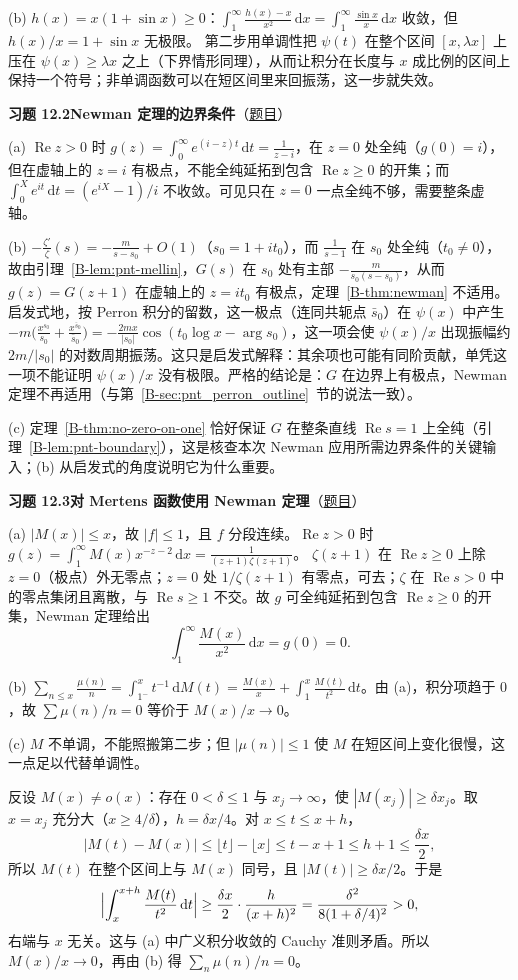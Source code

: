 \documentclass[11pt,a4paper]{article}
\newcommand{\dd}{\,\mathrm{d}}
\renewcommand{\Re}{\operatorname{Re}}
\newcommand{\bref}[1]{\ref*{B-#1}}
\newcommand{\Sol}[2]{%
  \par\addvspace{1.2em}\noindent
  \hypertarget{s:#1}{}\textbf{习题 #1\quad #2}\hfill{\small（\hyperlink{q:#1}{题目}）}\par
  \nopagebreak\smallskip}
\begin{document}
(b) $h(x)=x(1+\sin x)\ge0$：$\int_1^\infty\frac{h(x)-x}{x^2}\dd x=\int_1^\infty\frac{\sin x}x\dd x$ 收敛，但 $h(x)/x=1+\sin x$ 无极限。
第二步用单调性把 $\psi(t)$ 在整个区间 $[x,\lambda x]$ 上压在 $\psi(x)\ge\lambda x$ 之上（下界情形同理），从而让积分在长度与 $x$ 成比例的区间上保持一个符号；非单调函数可以在短区间里来回振荡，这一步就失效。

\Sol{12.2}{Newman 定理的边界条件}
(a) $\Re z>0$ 时 $g(z)=\int_0^\infty e^{(i-z)t}\dd t=\frac1{z-i}$，在 $z=0$ 处全纯（$g(0)=i$），但在虚轴上的 $z=i$ 有极点，不能全纯延拓到包含 $\Re z\ge0$ 的开集；而 $\int_0^X e^{it}\dd t=(e^{iX}-1)/i$ 不收敛。可见只在 $z=0$ 一点全纯不够，需要整条虚轴。

(b) $-\frac{\zeta'}{\zeta}(s)=-\frac m{s-s_0}+O(1)$（$s_0=1+it_0$），而 $\frac1{s-1}$ 在 $s_0$ 处全纯（$t_0\ne0$），故由引理~\bref{lem:pnt-mellin}，$G(s)$ 在 $s_0$ 处有主部 $-\frac m{s_0(s-s_0)}$，从而 $g(z)=G(z+1)$ 在虚轴上的 $z=it_0$ 有极点，定理~\bref{thm:newman} 不适用。
启发式地，按 Perron 积分的留数，这一极点（连同共轭点 $\bar s_0$）在 $\psi(x)$ 中产生 $-m\bigl(\frac{x^{s_0}}{s_0}+\frac{x^{\bar s_0}}{\bar s_0}\bigr)=-\frac{2mx}{|s_0|}\cos(t_0\log x-\arg s_0)$，这一项会使 $\psi(x)/x$ 出现振幅约 $2m/|s_0|$ 的对数周期振荡。这只是启发式解释：其余项也可能有同阶贡献，单凭这一项不能证明 $\psi(x)/x$ 没有极限。严格的结论是：$G$ 在边界上有极点，Newman 定理不再适用（与第~\bref{sec:pnt_perron_outline}~节的说法一致）。

(c) 定理~\bref{thm:no-zero-on-one} 恰好保证 $G$ 在整条直线 $\Re s=1$ 上全纯（引理~\bref{lem:pnt-boundary}），这是核查本次 Newman 应用所需边界条件的关键输入；(b) 从启发式的角度说明它为什么重要。

\Sol{12.3}{对 Mertens 函数使用 Newman 定理}
(a) $|M(x)|\le x$，故 $|f|\le1$，且 $f$ 分段连续。$\Re z>0$ 时
$g(z)=\int_1^\infty M(x)x^{-z-2}\dd x=\frac1{(z+1)\zeta(z+1)}$。
$\zeta(z+1)$ 在 $\Re z\ge0$ 上除 $z=0$（极点）外无零点；$z=0$ 处 $1/\zeta(z+1)$ 有零点，可去；$\zeta$ 在 $\Re s>0$ 中的零点集闭且离散，与 $\Re s\ge1$ 不交。故 $g$ 可全纯延拓到包含 $\Re z\ge0$ 的开集，Newman 定理给出
\[
  \int_1^\infty\frac{M(x)}{x^2}\dd x=g(0)=0 .
\]

(b) $\sum_{n\le x}\frac{\mu(n)}n=\int_{1^-}^x t^{-1}\dd M(t)=\frac{M(x)}x+\int_1^x\frac{M(t)}{t^2}\dd t$。由 (a)，积分项趋于 $0$，故 $\sum\mu(n)/n=0$ 等价于 $M(x)/x\to0$。

(c) $M$ 不单调，不能照搬第二步；但 $|\mu(n)|\le1$ 使 $M$ 在短区间上变化很慢，这一点足以代替单调性。

反设 $M(x)\ne o(x)$：存在 $0<\delta\le1$ 与 $x_j\to\infty$，使 $|M(x_j)|\ge\delta x_j$。取 $x=x_j$ 充分大（$x\ge4/\delta$），$h=\delta x/4$。对 $x\le t\le x+h$，
\[
  |M(t)-M(x)|\le\lfloor t\rfloor-\lfloor x\rfloor\le t-x+1\le h+1\le\frac{\delta x}2 ,
\]
所以 $M(t)$ 在整个区间上与 $M(x)$ 同号，且 $|M(t)|\ge\delta x/2$。于是
\[
  \Bigl|\int_x^{x+h}\frac{M(t)}{t^2}\dd t\Bigr|\ge\frac{\delta x}2\cdot\frac{h}{(x+h)^2}=\frac{\delta^2}{8(1+\delta/4)^2}>0 ,
\]
右端与 $x$ 无关。这与 (a) 中广义积分收敛的 Cauchy 准则矛盾。所以 $M(x)/x\to0$，再由 (b) 得 $\sum_n\mu(n)/n=0$。
\end{document}

